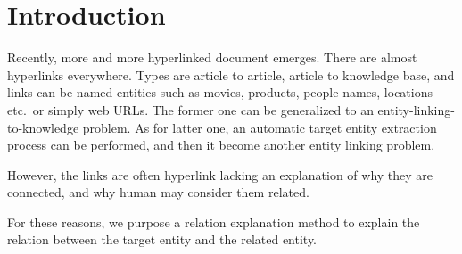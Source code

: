 \section{Introduction}

Recently, more and more hyperlinked document emerges. There are almost hyperlinks everywhere. Types are article to article, article to knowledge base, and links can be named entities such as movies, products, people names, locations etc.\ or simply web URLs. The former one can be generalized to an entity-linking-to-knowledge problem. As for latter one, an automatic target entity extraction process can be performed, and then it become another entity linking problem.

However, the links are often hyperlink lacking an explanation of why they are connected, and why human may consider them related.

For these reasons, we purpose a relation explanation method to explain the relation between the target entity and the related entity.